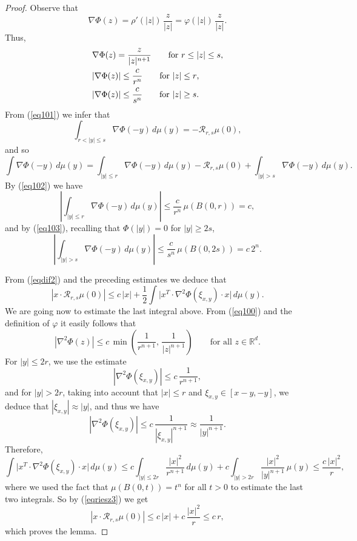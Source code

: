 \documentclass[11pt]{amsart}
\newcommand{\R}{{\mathbb R}}       %
\newcommand{\RR}{{\mathcal R}}
\newcommand{\rf}[1]{{(\ref{#1})}}
\newcommand{\vphi}{{\varphi}}
\theoremstyle{definition}
\theoremstyle{remark}
\numberwithin{equation}{section}
\begin{document}
\begin{proof}
Observe that 
\begin{equation}\label{eq100}
\nabla\Phi(z) = \rho'(|z|)\,\frac z{|z|} = \vphi(|z|)\,\frac z{|z|}.
\end{equation}
 Thus, 
 \begin{align}\label{eq101}
 &\nabla\Phi(z) = \frac z{|z|^{n+1}}\qquad \mbox{for $r\leq |z|\leq s$,}\\ \label{eq102}
&|\nabla\Phi(z)| \leq \frac c{r^{n}}\qquad \mbox{for $|z|\leq r$,}\\ \label{eq103}
&|\nabla\Phi(z)| \leq \frac c{s^{n}} \qquad \mbox{for $ |z|\geq s$.}
\end{align}
From \rf{eq101} we infer that
$$\int_{r<|y|\leq s} \nabla \Phi(-y)\,d\mu(y) = - \RR_{r,s}\mu(0),$$
and so
$$\int \nabla \Phi(-y)\,d\mu(y) = \int_{|y|\leq r} \nabla \Phi(-y)\,d\mu(y) - \RR_{r,s}\mu(0)
+
\int_{|y|> s} \nabla \Phi(-y)\,d\mu(y).
$$
By \rf{eq102} we have
$$\left|\int_{|y|\leq r} \nabla \Phi(-y)\,d\mu(y)\right|\leq \frac c{r^{n}}\,\mu(B(0,r))= c,$$
and by \rf{eq103}, recalling that $\Phi(|y|)=0$ for $|y|\geq2s$,
$$\left|\int_{|y|> s} \nabla \Phi(-y)\,d\mu(y)\right| \leq \frac c{s^{n}}\,\mu(B(0,2s))= c\,2^n.$$

From \rf{eqdif2} and the preceding estimates we deduce that
\begin{equation}\label{eqriesz3}
\left|x\cdot \RR_{r,s}\mu(0)\right| \leq c\,|x| + \frac12 \int \bigl|x^T\cdot \nabla^2\Phi(\xi_{x,y})\cdot x
\bigr|\,d\mu(y).
\end{equation}
We are going now to estimate the last integral above. From \rf{eq100} and the definition of $\vphi$ it
easily follows that
$$|\nabla^2\Phi(z)|\leq c\,\min\left(\frac1{r^{n+1}},\,\frac1{|z|^{n+1}}\right)\qquad
\mbox{for all $z\in\R^d$}.
$$
For $|y|\leq 2r$, we use the estimate
$$|\nabla^2\Phi(\xi_{x,y})|\leq c\,\frac1{r^{n+1}},$$
and for $|y|> 2r$, taking into account that
 $|x|\leq r$ and $\xi_{x,y}\in[x-y,-y]$, we deduce that $|\xi_{x,y}|\approx|y|$, and thus we have
$$|\nabla^2\Phi(\xi_{x,y})|\leq c\,\frac1{|\xi_{x,y}|^{n+1}}\approx \frac1{|y|^{n+1}}.$$
Therefore,
$$\int \bigl|x^T\cdot \nabla^2\Phi(\xi_{x,y})\cdot x
\bigr|\,d\mu(y) \leq c \int_{|y|\leq2r}  \frac{|x|^2}{r^{n+1}}\,d\mu(y) +
c \int_{|y|> 2r} \frac{|x|^2}{|y|^{n+1}}\,\mu(y)\leq \frac{c\,|x|^2}r,$$
where we used the fact that $\mu(B(0,t))=t^n$ for all $t>0$ to estimate the last two integrals.
So by \rf{eqriesz3} we get
$$\left|x\cdot \RR_{r,s}\mu(0)\right| \leq c\,|x| + c\,\frac{|x|^2}r \leq c\,r,$$
which proves the lemma.
\end{proof}
\end{document}
